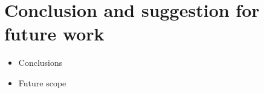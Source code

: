 \chapter{Conclusion and suggestion for future work}
\label{chapter:conclusion}

\begin{itemize}
\item Conclusions

\item Future scope
\end{itemize}
